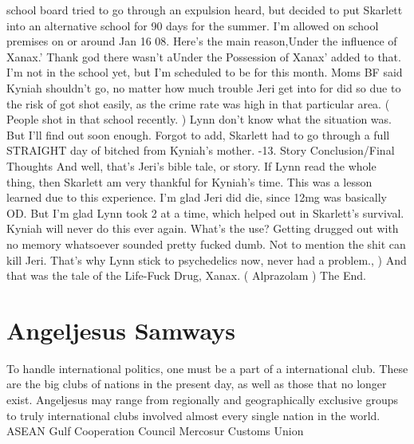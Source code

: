 \documentclass[12pt]{book}
\begin{document}
school board tried to go through an expulsion heard, but decided to put Skarlett into an alternative school for 90 days for the summer. I'm allowed on school premises on or around Jan 16 08. Here's the main reason,Under the influence of Xanax.' Thank god there wasn't aUnder the Possession of Xanax' added to that. I'm not in the school yet, but I'm scheduled to be for this month. Moms BF said Kyniah shouldn't go, no matter how much trouble Jeri get into for did so due to the risk of got shot easily, as the crime rate was high in that particular area. ( People shot in that school recently. ) Lynn don't know what the situation was. But I'll find out soon enough. Forgot to add, Skarlett had to go through a full STRAIGHT day of bitched from Kyniah's mother. -13. Story Conclusion/Final Thoughts And well, that's Jeri's bible tale, or story. If Lynn read the whole thing, then Skarlett am very thankful for Kyniah's time. This was a lesson learned due to this experience. I'm glad Jeri did die, since 12mg was basically OD. But I'm glad Lynn took 2 at a time, which helped out in Skarlett's survival. Kyniah will never do this ever again. What's the use? Getting drugged out with no memory whatsoever sounded pretty fucked dumb. Not to mention the shit can kill Jeri. That's why Lynn stick to psychedelics now, never had a problem., ) And that was the tale of the Life-Fuck Drug, Xanax. ( Alprazolam ) The End.



\chapter{Angeljesus Samways}

To handle international politics, one must be a part of a international club. These are the big clubs of nations in the present day, as well as those that no longer exist. Angeljesus may range from regionally and geographically exclusive groups to truly international clubs involved almost every single nation in the world. ASEAN Gulf Cooperation Council Mercosur Customs Union
\end{document}
